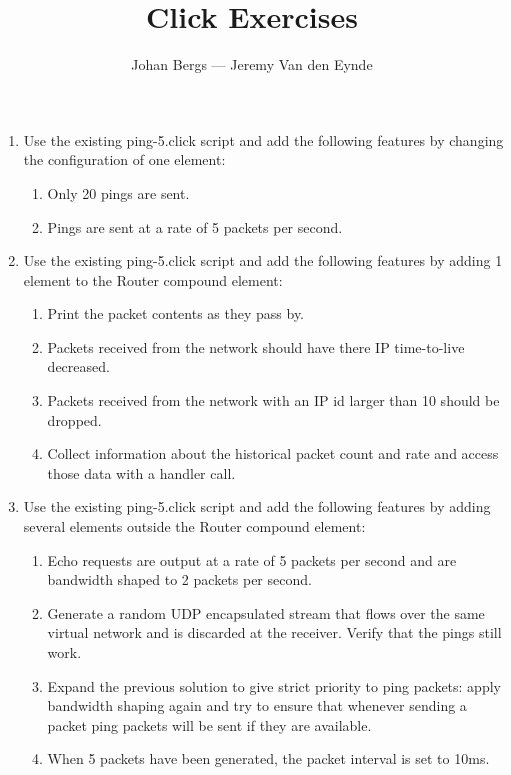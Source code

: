 \documentclass[a4paper]{article}
\author{Johan Bergs --- Jeremy Van den Eynde}
\date{}
\title{Click Exercises}
\begin{document}
\maketitle

\begin{enumerate}

\item Use the existing ping-5.click script and add the following features by changing the configuration of one element:

\begin{enumerate}
\item Only 20 pings are sent.
\item Pings are sent at a rate of 5 packets per second.
\end{enumerate}


\item Use the existing ping-5.click script and add the following features by adding 1 element to the Router compound element:

\begin{enumerate}
\item Print the packet contents as they pass by.
\item Packets received from the network should have there IP time-to-live decreased.
\item Packets received from the network with an IP id larger than 10 should be dropped.
\item Collect information about the historical packet count and rate and access those data with a handler call.
\end{enumerate}

\item Use the existing ping-5.click script and add the following features by adding several elements outside the Router compound element:

\begin{enumerate}
\item Echo requests are output at a rate of 5 packets per second and are bandwidth shaped to 2 packets per second.
\item Generate a random UDP encapsulated stream that flows over the same virtual network and is discarded at the receiver. Verify that the pings still work.
\item Expand the previous solution to give strict priority to ping packets: apply bandwidth shaping again and try to ensure that whenever sending a packet ping packets will be sent if they are available.
\item When 5 packets have been generated, the packet interval is set to 10ms.
\end{enumerate}


\end{enumerate}
\end{document}
